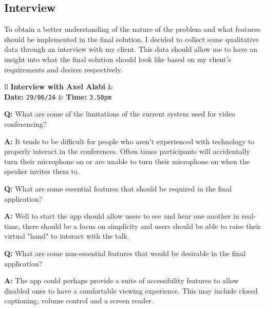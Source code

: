 \subsection{Interview}
\label{sec:interview}

To obtain a better understanding of the nature of the problem
and what features should be implemented in the final solution,
I decided to collect some qualitative data through an
interview with my client. This data should allow me to have an
insight into what the final solution should look like based
on my client's requirements and desires respectively.

\begin{tcolorbox}[
  boxrule=0pt, frame empty, colback=lightestgray, arc=0pt,
  breakable, colframe=white
]
  \begin{tblr}{ll}
    \textbf{Interview with Axel Alabi} & {}\\
    \textbf{Date: } \texttt{29/06/24} &
    {\hspace{-1.5cm} \textbf{Time: } \texttt{3.50pm}}
  \end{tblr}

  \vspace{0.2cm}

  \textbf{Q:} What are some of the limitations of the current
  system used for video conferencing? \vspace{0.05cm}

  \textbf{A:} It tends to be difficult for people who aren't
  experienced with technology to properly interact in the
  conferences. Often times participants will accidentally turn
  their microphone on or are unable to turn their microphone
  on when the speaker invites them to. \vspace{0.25cm}

  \textbf{Q:} What are some essential features that should be
  required in the final application? \vspace{0.05cm}

  \textbf{A:} Well to start the app should allow users to see
  and hear one another in real-time, there should be a focus on
  simplicity and users should be able to raise their virtual
  "hand" to interact with the talk. \vspace{0.25cm}

  \textbf{Q:} What are some non-essential features that would
  be desirable in the final application? \vspace{0.05cm}

  \textbf{A:} The app could perhaps provide a suite of
  accessibility features to allow disabled ones to have a
  comfortable viewing experience. This may include closed
  captioning, volume control and a screen reader.
  \vspace{0.25cm}


\end{tcolorbox}
